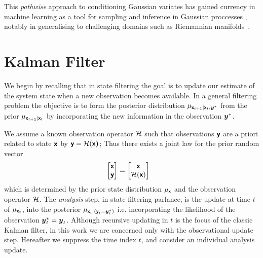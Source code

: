 \documentclass[wcp]{jmlr} %
\begin{document}
This \emph{pathwise} approach to conditioning Gaussian variates has gained currency in machine learning as a tool for sampling and inference in Gaussian proccesses \citep{Wilson2020Efficiently,Wilson2021Pathwise}, notably in generalising to challenging domains such as Riemannian manifolds~\citep{Borovitskiy2020Matern}.


\section{Kalman Filter}
We begin by recalling that in state filtering the goal is to update our estimate of the system state when a new observation becomes available. In a general filtering problem the objective is to form the posterior distribution \(\Law[\vrv{x}_{t+1} \gvn \vrv{x}_t, \vv{y}^*]\) from the prior \(\Law[\vrv{x}_{t+1} \gvn \vrv{x}_t]\) by incorporating the new information in the observation \(\boldsymbol{y}^*\).

We assume a known observation operator $\mathcal{H}$ such that observations $\boldsymbol{\mathsf{y}}$ are a priori related to state $\boldsymbol{\mathsf{x}}$ by $\boldsymbol{\mathsf{y}}=\mathcal{H}(\boldsymbol{\mathsf{x}}\boldsymbol{\mathsf{)}}$; Thus there exists a joint law for the prior random vector
\begin{align}
    \begin{bmatrix}
        \boldsymbol{\mathsf{x}}\\
        \boldsymbol{\mathsf{y}}
    \end{bmatrix} &= \begin{bmatrix}
        \boldsymbol{\mathsf{x}}\\
        \mathcal{H}(\boldsymbol{\mathsf{x}})
    \end{bmatrix}\label{eq:joint-law}
\end{align}
which is determined by the prior state distribution $\Law[\vrv{x}]$ and the observation operator $\mathcal{H}$.
The  \emph {analysis} step, in state filtering parlance, is the update at time $t$ of  \(\Law[\vrv{x}_{t}]\), into the posterior \( \Law[\vrv{x}_t \gvn (\vrv{y}_t{=}\vv{y}_t^*)]\)
i.e. incorporating the likelihood of the observation $\boldsymbol{y}_t^*=\boldsymbol{y}_t$.
Although  recursive updating in $t$ is the focus of the classic Kalman filter, in this work we are concerned only with the observational update step.
Hereafter we suppress the time index $t$, and consider an individual analysis update.
\end{document}
